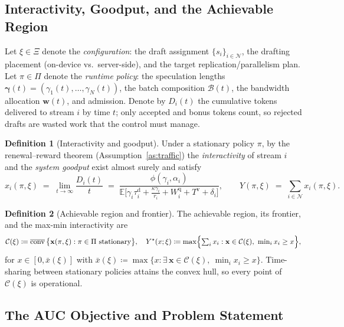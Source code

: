 \documentclass[11pt]{article}
\theoremstyle{definition}
\newtheorem{definition}{Definition}
\theoremstyle{remark}
\newcommand{\E}{\mathbb{E}}
\newcommand{\cN}{\mathcal{N}}
\newcommand{\cB}{\mathcal{B}}
\newcommand{\cC}{\mathcal{C}}
\newcommand{\bx}{\mathbf{x}}
\newcommand{\bw}{\mathbf{w}}
\newcommand{\bgamma}{\bm{\gamma}}
\begin{document}
\subsection{Interactivity, Goodput, and the Achievable Region}\label{ssec:metrics}

Let $\xi\in\Xi$ denote the \emph{configuration}: the draft assignment
$\{s_i\}_{i\in\cN}$, the drafting placement (on-device vs.\ server-side), and
the target replication/parallelism plan. Let $\pi\in\Pi$ denote the
\emph{runtime policy}: the speculation lengths
$\bgamma(t)=(\gamma_1(t),\dots,\gamma_N(t))$, the batch composition
$\cB(t)$, the bandwidth allocation $\bw(t)$, and admission. Denote by
$D_i(t)$ the cumulative tokens delivered to stream $i$ by time $t$; only
accepted and bonus tokens count, so rejected drafts are wasted work that the
control must manage.

\begin{definition}[Interactivity and goodput]\label{def:metrics}
Under a stationary policy $\pi$, by the renewal--reward theorem
(Assumption~\ref{as:traffic}) the \emph{interactivity} of stream $i$ and the
\emph{system goodput} exist almost surely and satisfy
\begin{equation}\label{eq:xi}
x_i(\pi,\xi)\;=\;\lim_{t\to\infty}\frac{D_i(t)}{t}
\;=\;\frac{\phi(\gamma_i,\alpha_i)}
{\E\bigl[\gamma_i\tau_i^{\mathrm{d}}+\tfrac{\kappa\gamma_i}{r_i}
+W_i^{\mathrm{q}}+T^{\mathrm{v}}+\delta_i\bigr]},
\qquad
Y(\pi,\xi)\;=\;\sum_{i\in\cN}x_i(\pi,\xi).
\end{equation}
\end{definition}

\begin{definition}[Achievable region and frontier]\label{def:frontier}
The achievable region, its frontier, and the max-min interactivity are
\begin{equation}\label{eq:region}
\cC(\xi)\coloneqq\overline{\mathrm{conv}}\,
\bigl\{\bx(\pi,\xi):\pi\in\Pi\ \text{stationary}\bigr\},
\quad
Y^{\star}(x;\xi)\coloneqq\max\Bigl\{\textstyle\sum_{i}x_i:
\bx\in\cC(\xi),\ \min_{i}x_i\ge x\Bigr\},
\end{equation}
for $x\in[0,\bar{x}(\xi)]$ with
$\bar{x}(\xi)\coloneqq\max\{x:\exists\,\bx\in\cC(\xi),\ \min_i x_i\ge x\}$.
Time-sharing between stationary policies attains the convex hull, so every
point of $\cC(\xi)$ is operational.
\end{definition}

\subsection{The AUC Objective and Problem Statement}\label{ssec:problem}
\end{document}
